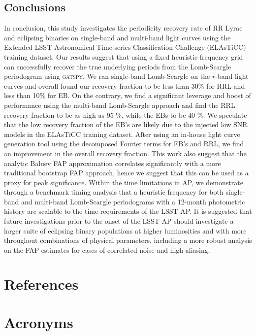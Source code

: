 \documentclass[DM,authoryear,toc]{lsstdoc}
\begin{document}
\subsection{Conclusions}
In conclusion, this study investigates the periodicity recovery rate of RR Lyrae and eclipsing binaries on single-band and multi-band light curves using the Extended LSST Astronomical Time-series Classification Challenge (ELAsTiCC) training dataset. Our results suggest that using a fixed heuristic frequency grid can successfully recover the true underlying periods from the Lomb-Scargle periodogram using \textsc{gatspy}. We ran single-band Lomb-Scargle on the $r$-band light curves and overall found our recovery fraction to be less than 30$\%$ for RRL and less than 10$\%$ for EB. On the contrary,  we find a significant leverage and boost of performance using the multi-band Lomb-Scargle approach and find the RRL recovery fraction to be as high as 95 $\%$, while the EBs to be 40 $\%$. We speculate that the low recovery fraction of the EB's are likely due to the injected low SNR models in the ELAsTiCC training dataset. After using an in-house light curve generation tool using the decomposed Fourier terms for EB's and RRL, we find an improvement in the overall recovery fraction. This work also suggest that the analytic Baluev FAP approximation correlates significantly with a more traditional bootstrap FAP approach, hence we suggest that this can be used as a proxy for peak significance. Within the time limitations in AP, we demonstrate through a benchmark timing analysis that a heuristic frequency for both single-band and multi-band Lomb-Scargle periodograms with a 12-month photometric history are scalable to the time requirements of the LSST AP. It is suggested that future investigations prior to the onset of the LSST AP should investigate a larger suite of eclipsing binary populations at higher luminosities and with more throughout combinations of physical parameters, including a more robust analysis on the FAP estimates for cases of correlated noise and high aliasing.

\appendix
\section{References} \label{sec:bib}


\section{Acronyms} \label{sec:acronyms}

\end{document}
